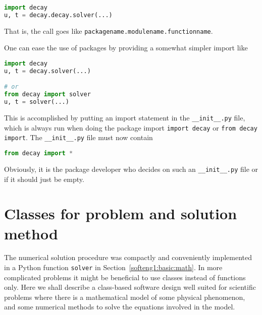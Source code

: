 \documentclass[graybox,sectrefs,envcountresetchap,open=right,final]{svmonodo}
\newenvironment{notice_mdfboxadmon}[1][]{
\begin{notice_mdfboxmdframed}[frametitle=#1]
}
{
\end{notice_mdfboxmdframed}
}
\begin{document}
\begin{lstlisting}[language=Python,style=gray]
import decay
u, t = decay.decay.solver(...)

\end{lstlisting}

That is, the call goes like \texttt{packagename.modulename.functionname}.


\begin{notice_mdfboxadmon}
One can ease the use of packages by providing a somewhat simpler
import like








\begin{lstlisting}[language=Python,style=gray]
import decay
u, t = decay.solver(...)

# or
from decay import solver
u, t = solver(...)

\end{lstlisting}

This is accomplished by putting an import statement in the \Verb!__init__.py!
file, which is always run when doing the package import \texttt{import decay}
or \texttt{from decay import}. The \Verb!__init__.py! file must now contain



\begin{lstlisting}[language=python,style=blue1bar_bluegreen]
from decay import *

\end{lstlisting}

Obviously, it is the package developer who decides on such an
\Verb!__init__.py! file or if it should just be empty.
\end{notice_mdfboxadmon} %



\section{Classes for problem and solution method}
\label{softeng1:prog:se:class}

The numerical solution procedure was compactly and conveniently
implemented in a Python function \texttt{solver} in Section~\ref{softeng1:basic:math}.  In more complicated problems it might be
beneficial to use classes instead of functions only. Here we shall
describe a class-based software design well suited for scientific
problems where there is a mathematical model of some physical
phenomenon, and some numerical methods to solve the equations involved
in the model.
\end{document}
